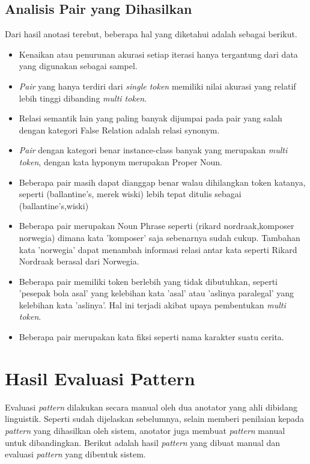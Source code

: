 \subsection{Analisis Pair yang Dihasilkan}
Dari hasil anotasi terebut, beberapa hal yang diketahui adalah sebagai berikut.
\begin{itemize}
  \item Kenaikan atau penurunan akurasi setiap iterasi hanya tergantung dari data yang digunakan sebagai sampel. 
  \item \textit{Pair} yang hanya terdiri dari \textit{single token} memiliki nilai akurasi yang relatif lebih tinggi dibanding \textit{multi token}.
  \item Relasi semantik lain yang paling banyak dijumpai pada pair yang salah dengan kategori False Relation adalah relasi synonym. 
  \item \textit{Pair} dengan kategori benar instance-class banyak yang merupakan \textit{multi token}, dengan kata hyponym merupakan Proper Noun. 
  \item Beberapa pair masih dapat dianggap benar walau dihilangkan token katanya, seperti (ballantine's, merek wiski) lebih tepat ditulis sebagai (ballantine's,wiski)
  \item Beberapa pair merupakan Noun Phrase seperti (rikard nordraak,komposer norwegia) dimana kata 'komposer' saja sebenarnya sudah cukup. Tambahan kata 'norwegia' dapat menambah informasi relasi antar kata seperti Rikard Nordraak berasal dari Norwegia.
  \item Beberapa pair memiliki token berlebih yang tidak dibutuhkan, seperti 'pesepak bola asal' yang kelebihan kata 'asal' atau 'aslinya paralegal' yang kelebihan kata 'aslinya'. Hal ini terjadi akibat upaya pembentukan \textit{multi token}. 
  \item Beberapa pair merupakan kata fiksi seperti nama karakter suatu cerita.
\end{itemize}

\section{Hasil Evaluasi Pattern}
Evaluasi \textit{pattern} dilakukan secara manual oleh dua anotator yang ahli dibidang linguistik. Seperti sudah dijelaskan sebelumnya, selain memberi penilaian kepada \textit{pattern} yang dihasilkan oleh sistem, anotator juga membuat \textit{pattern} manual untuk dibandingkan. Berikut adalah hasil \textit{pattern} yang dibuat manual dan evaluasi \textit{pattern} yang dibentuk sistem.

